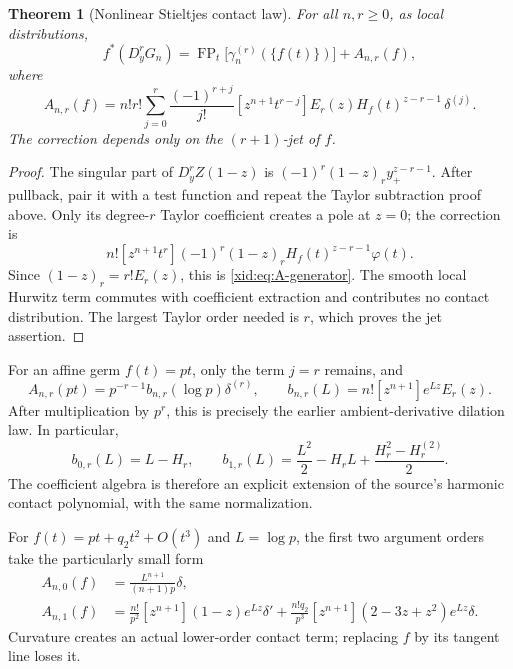 \documentclass[11pt,a4paper]{article}
\numberwithin{equation}{section}
\newtheorem{theorem}{Theorem}[section]
\theoremstyle{definition}
\theoremstyle{remark}
\DeclareMathOperator{\FP}{FP}
\begin{document}
\begin{theorem}[Nonlinear Stieltjes contact law]
\label{xid:thm:stieltjes-nonlinear}
For all $n,r\ge0$, as local distributions,
\begin{equation}\label{xid:eq:stieltjes-nonlinear}
 f^*(D_y^rG_n)
 =\FP_t\bigl[\gamma_n^{(r)}(\{f(t)\})\bigr]
       +A_{n,r}(f),
\end{equation}
where
\begin{equation}\label{xid:eq:A-generator}
 A_{n,r}(f)=n!r!\sum_{j=0}^r\frac{(-1)^{r+j}}{j!}
 [z^{n+1}t^{r-j}]
 E_r(z)H_f(t)^{z-r-1}\,\delta^{(j)}.
\end{equation}
The correction depends only on the $(r+1)$-jet of $f$.
\end{theorem}

\begin{proof}
The singular part of $D_y^r Z(1-z)$ is
$(-1)^r(1-z)_r y_+^{z-r-1}$.  After pullback, pair it with a test
function and repeat the Taylor subtraction proof above.  Only its
degree-$r$ Taylor coefficient creates a pole at $z=0$; the correction
is
\[
 n![z^{n+1}t^r](-1)^r(1-z)_r
                  H_f(t)^{z-r-1}\varphi(t).
\]
Since $(1-z)_r=r!E_r(z)$, this is \eqref{xid:eq:A-generator}.
The smooth local Hurwitz term commutes with coefficient extraction
and contributes no contact distribution.  The largest Taylor order
needed is $r$, which proves the jet assertion.
\end{proof}

For an affine germ $f(t)=pt$, only the term $j=r$ remains, and
\begin{equation}\label{xid:eq:A-affine}
 A_{n,r}(pt)=p^{-r-1}b_{n,r}(\log p)\delta^{(r)},\qquad
 b_{n,r}(L)=n![z^{n+1}]e^{Lz}E_r(z).
\end{equation}
After multiplication by $p^r$, this is precisely the earlier
ambient-derivative dilation law.  In particular,
\[
 b_{0,r}(L)=L-H_r,\qquad
 b_{1,r}(L)=\frac{L^2}{2}-H_rL+
                    \frac{H_r^2-H_r^{(2)}}2.
\]
The coefficient algebra is therefore an explicit extension of the
source's harmonic contact polynomial, with the same normalization.

For $f(t)=pt+q_2t^2+O(t^3)$ and $L=\log p$, the first two argument
orders take the particularly small form
\begin{align}
 A_{n,0}(f)&=\frac{L^{n+1}}{(n+1)p}\delta,\label{xid:eq:A0}\\
 A_{n,1}(f)&=\frac{n!}{p^2}[z^{n+1}](1-z)e^{Lz}\delta'
 +\frac{n!q_2}{p^3}[z^{n+1}](2-3z+z^2)e^{Lz}\delta.
 \label{xid:eq:A1}
\end{align}
Curvature creates an actual lower-order contact term; replacing $f$
by its tangent line loses it.
\end{document}
